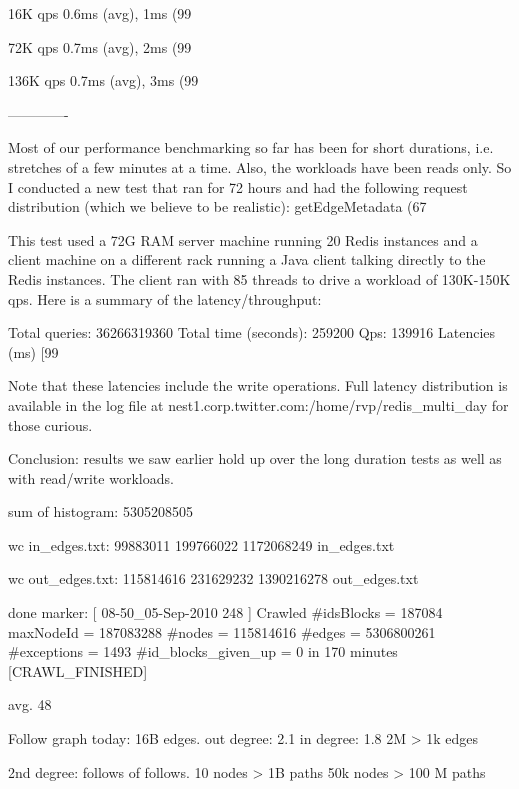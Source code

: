 \documentclass{article}
\begin{document}
16K qps
0.6ms (avg), 1ms (99%

72K qps
0.7ms (avg), 2ms (99%

136K qps
0.7ms (avg), 3ms (99%

-------------

Most of our performance benchmarking so far has been for short durations, i.e. stretches of a few minutes at a time. Also, the workloads have been reads only. So I conducted a new test that ran for 72 hours and had the following request distribution (which we believe to be realistic): getEdgeMetadata (67%

This test used a 72G RAM server machine running 20 Redis instances and a client machine on a different rack running a Java client talking directly to the Redis instances. The client ran with 85 threads to drive a workload of 130K-150K qps. Here is a summary of the latency/throughput:

Total queries: 36266319360
Total time (seconds): 259200
Qps: 139916
Latencies (ms) [99%

Note that these latencies include the write operations. Full latency distribution is available in the log file at nest1.corp.twitter.com:/home/rvp/redis_multi_day for those curious. 

Conclusion: results we saw earlier hold up over the long duration tests as well as with read/write workloads.

sum of histogram:
5305208505

wc in_edges.txt: 99883011  199766022 1172068249 in_edges.txt

wc out_edges.txt: 115814616  231629232 1390216278 out_edges.txt

done marker:
[ 08-50_05-Sep-2010 248 ] Crawled #idsBlocks = 187084 maxNodeId = 187083288 #nodes = 115814616 #edges = 5306800261 #exceptions = 1493 #id_blocks_given_up = 0 in 170 minutes [CRAWL_FINISHED]

avg. 48

Follow graph today:
16B edges.
out degree: 2.1
in degree: 1.8
2M > 1k edges


2nd degree: follows of follows. 10 nodes > 1B paths
50k nodes > 100 M paths
\end{document}
